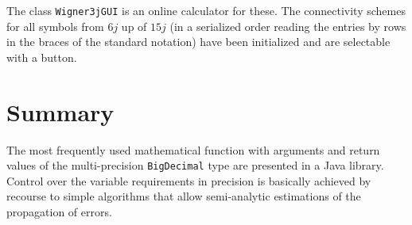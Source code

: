 \documentclass[showpacs,showkeys,amssymb,aps,twocolumn]{revtex4-1}
\begin{document}
The class \texttt{Wigner3jGUI} is an online calculator for these.
The connectivity schemes for all symbols from $6j$ up of $15j$
(in a serialized order reading the entries by rows in the braces
of the standard notation) have been initialized and are selectable with a button.


\section{Summary} 
The most frequently used mathematical function
with arguments and return values of the multi-precision \texttt{BigDecimal}
type are presented in a Java library. Control over the variable
requirements in precision is basically achieved by recourse to simple algorithms
that allow semi-analytic estimations of the propagation of errors.


%



\end{document}
